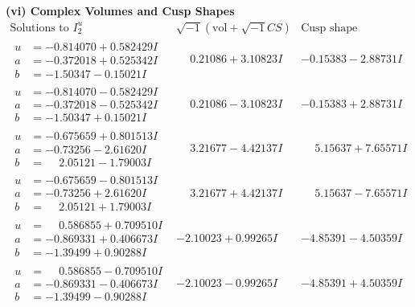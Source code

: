 \documentclass[1p]{elsarticle_modified}
\theoremstyle{definition}
\newcommand{\I}{\sqrt{-1}}
\begin{document}
\newpage\flushleft \textbf{(vi) Complex Volumes and Cusp Shapes}
$$\begin{array}{c|c|c}  
\text{Solutions to }I^u_{2}& \I (\text{vol} + \sqrt{-1}CS) & \text{Cusp shape}\\
 \hline 
\begin{aligned}
u &= -0.814070 + 0.582429 I \\
a &= -0.372018 + 0.525342 I \\
b &= -1.50347 - 0.15021 I\end{aligned}
 & \phantom{-}0.21086 + 3.10823 I & -0.15383 - 2.88731 I \\ \hline\begin{aligned}
u &= -0.814070 - 0.582429 I \\
a &= -0.372018 - 0.525342 I \\
b &= -1.50347 + 0.15021 I\end{aligned}
 & \phantom{-}0.21086 - 3.10823 I & -0.15383 + 2.88731 I \\ \hline\begin{aligned}
u &= -0.675659 + 0.801513 I \\
a &= -0.73256 - 2.61620 I \\
b &= \phantom{-}2.05121 - 1.79003 I\end{aligned}
 & \phantom{-}3.21677 - 4.42137 I & \phantom{-}5.15637 + 7.65571 I \\ \hline\begin{aligned}
u &= -0.675659 - 0.801513 I \\
a &= -0.73256 + 2.61620 I \\
b &= \phantom{-}2.05121 + 1.79003 I\end{aligned}
 & \phantom{-}3.21677 + 4.42137 I & \phantom{-}5.15637 - 7.65571 I \\ \hline\begin{aligned}
u &= \phantom{-}0.586855 + 0.709510 I \\
a &= -0.869331 + 0.406673 I \\
b &= -1.39499 + 0.90288 I\end{aligned}
 & -2.10023 + 0.99265 I & -4.85391 - 4.50359 I \\ \hline\begin{aligned}
u &= \phantom{-}0.586855 - 0.709510 I \\
a &= -0.869331 - 0.406673 I \\
b &= -1.39499 - 0.90288 I\end{aligned}
 & -2.10023 - 0.99265 I & -4.85391 + 4.50359 I \\ \hline\begin{aligned}

\end{aligned}
\end{array}$$
\end{document}
